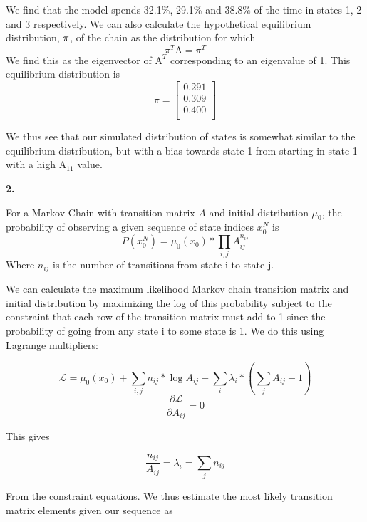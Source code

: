 \documentclass{article}
\begin{document}
We find that the model spends 32.1\%, 29.1\% and 38.8\% of the time in states 1, 2 and 3 respectively.
We can also calculate the hypothetical equilibrium distribution, $\bf{\pi}$, of the chain as the distribution for which
\begin{equation}
\pi^{T} \text{A} = \pi^T
\end{equation}
We find this as the eigenvector of $\text{A}^T$ corresponding to an eigenvalue of 1. This equilibrium distribution is
\[
\pi = 
\begin{bmatrix}
   0.291 \\
   0.309  \\
   0.400  \\
\end{bmatrix}
\]

We thus see that our simulated distribution of states is somewhat similar to the equilibrium distribution, but with a bias towards state 1 from starting in state 1 with a high $\text{A}_{11}$ value.


\textbf{\large{2.}}

For a Markov Chain with transition matrix $A$ and initial distribution $\mu_0$, the probability of observing a given sequence of state indices $x_0^N$ is
\begin{equation}
P(x_0^N) = \mu_0(x_0) * \prod_{i, j}{A_{ij}^{n_{ij}}}
\end{equation}
Where $n_{ij}$ is the number of transitions from state i to state j.

We can calculate the maximum likelihood Markov chain transition matrix and initial distribution by maximizing the log of this probability subject to the constraint that each row of the transition matrix must add to 1 since the probability of going from any state i to some state is 1. We do this using Lagrange multipliers:

\begin{equation}
\mathcal{L} =\mu_0(x_0) + \sum_{i, j}{n_{ij}*\log{A_{ij}}}  - \sum_i{\lambda_i * (\sum_j{A_{ij}}-1)}
\end{equation}
\begin{equation}
\dfrac{\partial \mathcal{L}}{\partial A_{ij}} =  0
\end{equation}

This gives

\begin{equation}
\dfrac{n_{ij}}{A_{ij}} = \lambda_i = \sum_j{n_{ij}} 
\end{equation}

From the constraint equations.
We thus estimate the most likely transition matrix elements given our sequence as 
\end{document}

